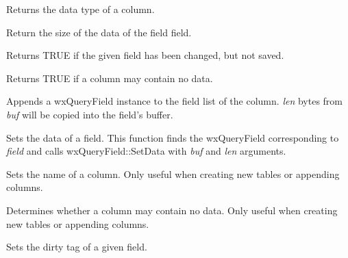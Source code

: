 Returns the data type of a column.



Return the size of the data of the field field.



Returns TRUE if the given field has been changed, but not saved.



Returns TRUE if a column may contain no data.



Appends a wxQueryField instance to the field list of the column. {\it len} bytes from\rtfsp
{\it buf} will be copied into the field's buffer.



Sets the data of a field. This function finds the wxQueryField corresponding to\rtfsp
{\it field} and calls wxQueryField::SetData with {\it buf} and {\it len} arguments.



Sets the name of a column. Only useful when creating new tables or
appending columns.
 


Determines whether a column may contain no data. Only useful when creating new tables or
appending columns.



Sets the dirty tag of a given field.


  
